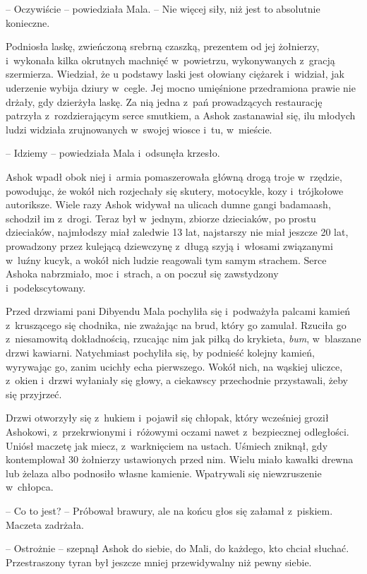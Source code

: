 \documentclass[oneside,polish,11pt,rmheadings]{mwbk}
\begin{document}
-- Oczywiście -- powiedziała Mala. -- Nie więcej siły, niż jest to absolutnie konieczne. 

 Podniosła laskę, zwieńczoną srebrną czaszką, prezentem od jej żołnierzy,  i~wykonała kilka okrutnych machnięć w~powietrzu, wykonywanych z~gracją szermierza. Wiedział, że u podstawy laski jest ołowiany ciężarek i~widział, jak uderzenie wybija dziury w~cegle. Jej mocno umięśnione przedramiona prawie nie drżały, gdy dzierżyła laskę. Za nią jedna z~pań prowadzących restaurację patrzyła z~rozdzierającym serce smutkiem, a Ashok zastanawiał się, ilu młodych ludzi widziała zrujnowanych w~swojej wiosce i~tu, w~mieście.

-- Idziemy -- powiedziała Mala i~odsunęła krzesło.

 Ashok wpadł obok niej i~armia pomaszerowała główną drogą troje w~rzędzie, powodując, że wokół nich rozjechały się skutery, motocykle, kozy i~trójkołowe autoriksze. Wiele razy Ashok widywał na ulicach dumne gangi badamaash, schodził im z~drogi. Teraz był w~jednym, zbiorze dzieciaków, po prostu dzieciaków, najmłodszy miał zaledwie 13 lat, najstarszy nie miał jeszcze 20 lat, prowadzony przez kulejącą dziewczynę z~długą szyją i~włosami związanymi w~luźny kucyk, a wokół nich ludzie reagowali tym samym strachem. Serce Ashoka nabrzmiało, moc i~strach, a on poczuł się zawstydzony i~podekscytowany.

Przed drzwiami pani Dibyendu Mala pochyliła się i~podważyła palcami kamień z~kruszącego się chodnika, nie zważając na brud, który go zamulał. Rzuciła go z~niesamowitą dokładnością, rzucając nim jak piłką do krykieta, \textit{bum}, w~blaszane drzwi kawiarni. Natychmiast pochyliła się, by podnieść kolejny kamień, wyrywając go, zanim ucichły echa pierwszego. Wokół nich, na wąskiej uliczce, z~okien i~drzwi wyłaniały się głowy, a ciekawscy przechodnie przystawali, żeby się przyjrzeć.

Drzwi otworzyły się z~hukiem i~pojawił się chłopak, który wcześniej groził Ashokowi, z~przekrwionymi i~różowymi oczami nawet z~bezpiecznej odległości. Uniósł maczetę jak miecz, z~warknięciem na ustach. Uśmiech zniknął, gdy kontemplował 30 żołnierzy ustawionych przed nim. Wielu miało kawałki drewna lub żelaza albo podnosiło własne kamienie. Wpatrywali się niewzruszenie w~chłopca.

-- Co to jest? -- Próbował brawury, ale na końcu głos się załamał z~piskiem. Maczeta zadrżała.

-- Ostrożnie -- szepnął Ashok do siebie, do Mali, do każdego, kto chciał słuchać. Przestraszony tyran był jeszcze mniej przewidywalny niż pewny siebie.
\end{document}
